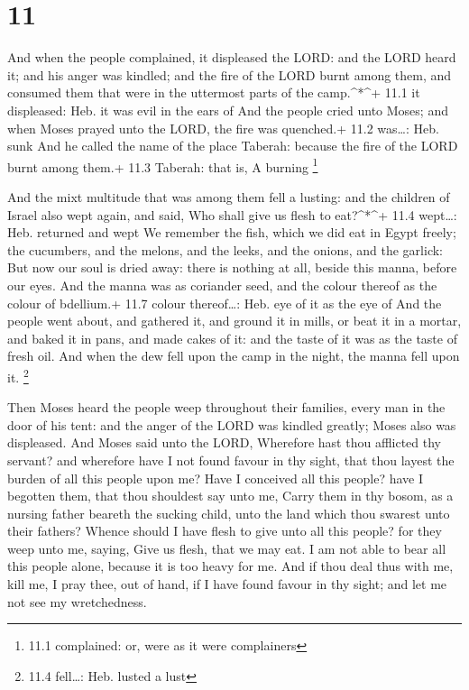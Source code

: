 \hypertarget{section-10}{%
\section{11}\label{section-10}}

 And when the people complained, it displeased the LORD: and
the LORD heard it; and his anger was kindled; and the fire of the LORD
burnt among them, and consumed them that were in the uttermost parts of
the camp.\^{}*\^{}+ 11.1 it displeased: Heb. it was evil in the ears of
 And the people cried unto Moses; and when Moses prayed unto
the LORD, the fire was quenched.+ 11.2 was\ldots: Heb. sunk 
And he called the name of the place Taberah: because the fire of the
LORD burnt among them.+ 11.3 Taberah: that is, A burning \footnote{11.1
  complained: or, were as it were complainers}

 And the mixt multitude that was among them fell a lusting:
and the children of Israel also wept again, and said, Who shall give us
flesh to eat?\^{}*\^{}+ 11.4 wept\ldots: Heb. returned and wept
 We remember the fish, which we did eat in Egypt freely; the
cucumbers, and the melons, and the leeks, and the onions, and the
garlick:  But now our soul is dried away: there is nothing
at all, beside this manna, before our eyes.  And the manna
was as coriander seed, and the colour thereof as the colour of
bdellium.+ 11.7 colour thereof\ldots: Heb. eye of it as the eye of
 And the people went about, and gathered it, and ground it
in mills, or beat it in a mortar, and baked it in pans, and made cakes
of it: and the taste of it was as the taste of fresh oil. 
And when the dew fell upon the camp in the night, the manna fell upon
it. \footnote{11.4 fell\ldots: Heb. lusted a lust}

 Then Moses heard the people weep throughout their
families, every man in the door of his tent: and the anger of the LORD
was kindled greatly; Moses also was displeased.  And Moses
said unto the LORD, Wherefore hast thou afflicted thy servant? and
wherefore have I not found favour in thy sight, that thou layest the
burden of all this people upon me?  Have I conceived all
this people? have I begotten them, that thou shouldest say unto me,
Carry them in thy bosom, as a nursing father beareth the sucking child,
unto the land which thou swarest unto their fathers? 
Whence should I have flesh to give unto all this people? for they weep
unto me, saying, Give us flesh, that we may eat.  I am not
able to bear all this people alone, because it is too heavy for me.
 And if thou deal thus with me, kill me, I pray thee, out
of hand, if I have found favour in thy sight; and let me not see my
wretchedness.

